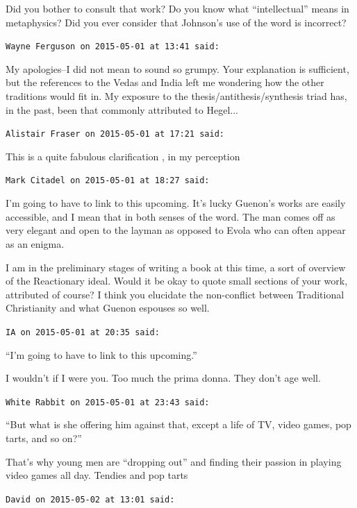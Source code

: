 \begin{footnotesize}
\begin{sffamily}
Did you bother to consult that work? Do you know what ``intellectual'' means in metaphysics? Did you ever consider that Johnson's use of the word is incorrect?

\hfill

\texttt{Wayne Ferguson on 2015-05-01 at 13:41 said:}

My apologies--I did not mean to sound so grumpy. Your explanation is sufficient, but the references to the Vedas and India left me wondering how the other traditions would fit in. My exposure to the thesis/antithesis/synthesis triad has, in the past, been that commonly attributed to Hegel... 

\hfill

\texttt{Alistair Fraser on 2015-05-01 at 17:21 said:}

This is a quite fabulous clarification , in my perception

\hfill

\texttt{Mark Citadel on 2015-05-01 at 18:27 said:}

I'm going to have to link to this upcoming. It's lucky Guenon's works are easily accessible, and I mean that in both senses of the word. The man comes off as very elegant and open to the layman as opposed to Evola who can often appear as an enigma.

I am in the preliminary stages of writing a book at this time, a sort of overview of the Reactionary ideal. Would it be okay to quote small sections of your work, attributed of course? I think you elucidate the non-conflict between Traditional Christianity and what Guenon espouses so well.

\hfill

\texttt{IA on 2015-05-01 at 20:35 said:}

``I'm going to have to link to this upcoming.''

I wouldn't if I were you. Too much the prima donna. They don't age well.

\hfill

\texttt{White Rabbit on 2015-05-01 at 23:43 said:}

``But what is she offering him against that, except a life of TV, video games, pop tarts, and so on?''

That's why young men are ``dropping out'' and finding their passion in playing video games all day. Tendies and pop tarts

\hfill

\texttt{David on 2015-05-02 at 13:01 said:}


\end{sffamily}
\end{footnotesize}
